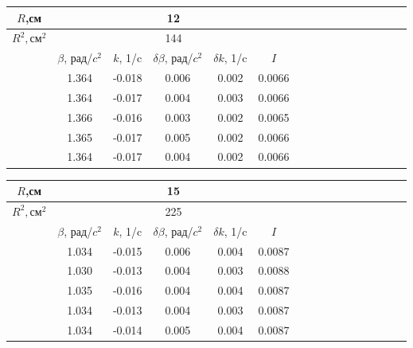 \documentclass[14pt]{article}
\begin{document}
\begin{center}
\begin{tabular}{|c|c|c|c|c|c|c|c|c|c|c|c|c|c|c|c|}
\hline
$R$,см	&	\multicolumn{5}{|c|}{12}			\\
\hline
$R^2, \text{см}^2$	&	\multicolumn{5}{|c|}{144}			\\
\hline
		&	$\beta$, рад/$c^2$	&	$k$, 1/c	&	$\delta\beta$, рад/$c^2$	&	$\delta k$, 1/c		&	$I$		\\
\hline
		&	1.364				&	-0.018		&	0.006						&	0.002				&	0.0066	\\
\hline
		&	1.364				&	-0.017		&	0.004						&	0.003				&	0.0066	\\
\hline
		&	1.366				&	-0.016		&	0.003						&	0.002				&	0.0065	\\
\hline
		&	1.365				&	-0.017		&	0.005						&	0.002				&	0.0066	\\
\hline
		&	1.364				&	-0.017		&	0.004						&	0.002				&	0.0066	\\
\hline
\end{tabular}
\end{center}

\begin{center}
\begin{tabular}{|c|c|c|c|c|c|c|c|c|c|c|c|c|c|c|c|}
\hline
$R$,см	&	\multicolumn{5}{|c|}{15}			\\
\hline
$R^2, \text{см}^2$	&	\multicolumn{5}{|c|}{225}			\\
\hline
		&	$\beta$, рад/$c^2$	&	$k$, 1/c	&	$\delta\beta$, рад/$c^2$	&	$\delta k$, 1/c		&	$I$		\\
\hline
		&	1.034				&	-0.015		&	0.006						&	0.004				&	0.0087	\\
\hline
		&	1.030				&	-0.013		&	0.004						&	0.003				&	0.0088	\\
\hline
		&	1.035				&	-0.016		&	0.004						&	0.004				&	0.0087	\\
\hline
		&	1.034				&	-0.013		&	0.004						&	0.003				&	0.0087	\\
\hline
		&	1.034				&	-0.014		&	0.005						&	0.004				&	0.0087	\\
\hline
\end{tabular}
\end{center}
\end{document}
